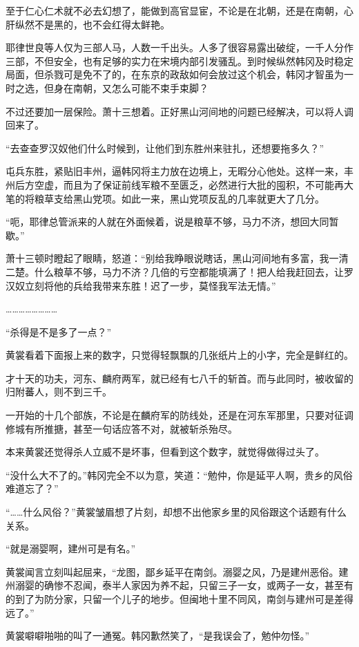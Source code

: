 至于仁心仁术就不必去幻想了，能做到高官显宦，不论是在北朝，还是在南朝，心肝纵然不是黑的，也不会红得太鲜艳。

耶律世良等人仅为三部人马，人数一千出头。人多了很容易露出破绽，一千人分作三部，不但安全，也有足够的实力在宋境内部引发骚乱。到时候纵然韩冈及时稳定局面，但杀戮可是免不了的，在东京的政敌如何会放过这个机会，韩冈才智虽为一时之选，但身在南朝，又怎么可能不束手束脚？

不过还要加一层保险。萧十三想着。正好黑山河间地的问题已经解决，可以将人调回来了。

“去查查罗汉奴他们什么时候到，让他们到东胜州来驻扎，还想要拖多久？”

屯兵东胜，紧贴旧丰州，逼韩冈将主力放在边境上，无暇分心他处。这样一来，丰州后方空虚，而且为了保证前线军粮不至匮乏，必然进行大批的囤积，不可能再大笔的将粮草支给黑山党项。如此一来，黑山党项反乱的几率就更大了几分。

“呃，耶律总管派来的人就在外面候着，说是粮草不够，马力不济，想回大同暂歇。”

萧十三顿时瞪起了眼睛，怒道：“别给我睁眼说瞎话，黑山河间地有多富，我一清二楚。什么粮草不够，马力不济？几倍的亏空都能填满了！把人给我赶回去，让罗汉奴立刻将他的兵给我带来东胜！迟了一步，莫怪我军法无情。”

……………………

“杀得是不是多了一点？”

黄裳看着下面报上来的数字，只觉得轻飘飘的几张纸片上的小字，完全是鲜红的。

才十天的功夫，河东、麟府两军，就已经有七八千的斩首。而与此同时，被收留的归附蕃人，则不到三千。

一开始的十几个部族，不论是在麟府军的防线处，还是在河东军那里，只要对征调修城有所推搪，甚至一句话应答不对，就被斩杀殆尽。

本来黄裳还觉得杀人立威不是坏事，但看到这个数字，就觉得做得过头了。

“没什么大不了的。”韩冈完全不以为意，笑道：“勉仲，你是延平人啊，贵乡的风俗难道忘了？”

“……什么风俗？”黄裳皱眉想了片刻，却想不出他家乡里的风俗跟这个话题有什么关系。

“就是溺婴啊，建州可是有名。”

黄裳闻言立刻叫起屈来，“龙图，鄙乡延平在南剑。溺婴之风，乃是建州恶俗。建州溺婴的确惨不忍闻，泰半人家因为养不起，只留三子一女，或两子一女，甚至有的到了为防分家，只留一个儿子的地步。但闽地十里不同风，南剑与建州可是差得远了。”

黄裳噼噼啪啪的叫了一通冤。韩冈歉然笑了，“是我误会了，勉仲勿怪。”

